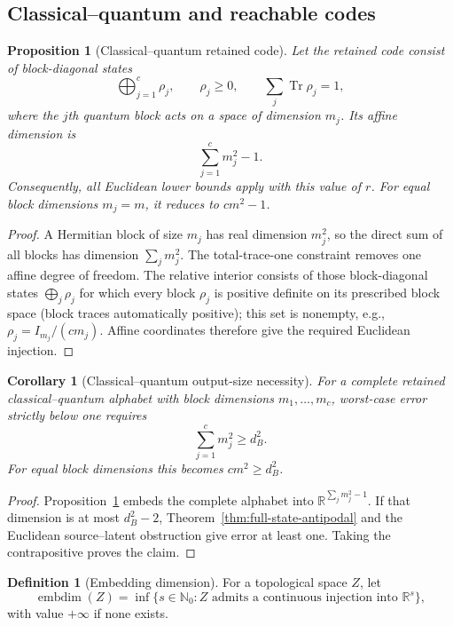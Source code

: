 \documentclass[11pt,a4paper]{article}
\theoremstyle{definition}
\newtheorem{definition}{Definition}[section]
\theoremstyle{plain}
\newtheorem{proposition}[theorem]{Proposition}
\newtheorem{corollary}[theorem]{Corollary}
\theoremstyle{remark}
\DeclareMathOperator{\Tr}{Tr}
\DeclareMathOperator{\embdim}{embdim}
\begin{document}
\subsection{Classical--quantum and reachable codes}

\begin{proposition}[Classical--quantum retained code]
\label{prop:cq-code}
Let the retained code consist of block-diagonal states
\[
\bigoplus_{j=1}^c\rho_j,
\qquad
\rho_j\geq0,
\qquad
\sum_j\Tr\rho_j=1,
\]
where the $j$th quantum block acts on a space of dimension $m_j$. Its
affine dimension is
\[
\sum_{j=1}^cm_j^2-1.
\]
Consequently, all Euclidean lower bounds apply with this value of $r$.
For equal block dimensions $m_j=m$, it reduces to $cm^2-1$.
\end{proposition}

\begin{proof}
A Hermitian block of size $m_j$ has real dimension $m_j^2$, so the direct
sum of all blocks has dimension $\sum_jm_j^2$. The total-trace-one
constraint removes one affine degree of freedom. The relative interior consists of those block-diagonal states $\bigoplus_j\rho_j$ for which every block $\rho_j$ is positive definite on its prescribed block space (block traces automatically positive); this set is nonempty, e.g., $\rho_j=I_{m_j}/(c m_j)$. Affine coordinates therefore give the required Euclidean
injection.
\end{proof}

\begin{corollary}[Classical--quantum output-size necessity]
\label{cor:cq-output-size}
For a complete retained classical--quantum alphabet with block dimensions
$m_1,\ldots,m_c$, worst-case error strictly below one requires
\[
\sum_{j=1}^cm_j^2\geq d_B^2.
\]
For equal block dimensions this becomes $cm^2\geq d_B^2$.
\end{corollary}

\begin{proof}
Proposition~\ref{prop:cq-code} embeds the complete alphabet into
$\mathbb R^{\sum_jm_j^2-1}$. If that dimension is at most $d_B^2-2$,
Theorem~\ref{thm:full-state-antipodal} and the Euclidean source--latent
obstruction give error at least one. Taking the contrapositive proves the
claim.
\end{proof}

\begin{definition}[Embedding dimension]
For a topological space $Z$, let
\[
\embdim(Z)=\inf\{s\in\mathbb N_0:Z\text{ admits a continuous injection into }
\mathbb R^s\},
\]
with value $+\infty$ if none exists.
\end{definition}
\end{document}
